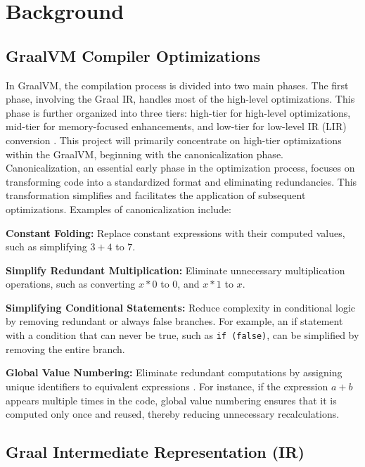 \chapter[Background]{Background}
\section{GraalVM Compiler Optimizations}

In GraalVM, the compilation process is divided into two main phases. The first phase, involving the Graal IR, handles most of the high-level optimizations. This phase is further organized into three tiers: high-tier for high-level optimizations, mid-tier for memory-focused enhancements, and low-tier for low-level IR (LIR) conversion \cite{Graal2021}. This project will primarily concentrate on high-tier optimizations within the GraalVM, beginning with the canonicalization phase. Canonicalization, an essential early phase in the optimization process, focuses on transforming code into a standardized format and eliminating redundancies. This transformation simplifies and facilitates the application of subsequent optimizations. Examples of canonicalization include:

\begin{description}
    \item \textbf{Constant Folding:} Replace constant expressions with their computed values, such as simplifying \newline
    \(3 + 4\) to \(7\).
    \item \textbf{Simplify Redundant Multiplication:} Eliminate unnecessary multiplication operations, such as converting \(x * 0\) to 0, and \(x * 1\) to \(x\).
    \item \textbf{Simplifying Conditional Statements:} Reduce complexity in conditional logic by removing redundant or always false branches. For example, an if statement with a condition that can never be true, such as \texttt{if (false)}, can be simplified by removing the entire branch.
    \item \textbf{Global Value Numbering:} Eliminate redundant computations by assigning unique identifiers to equivalent expressions \cite{Cliff1995}. For instance, if the expression \(a + b\) appears multiple times in the code, global value numbering ensures that it is computed only once and reused, thereby reducing unnecessary recalculations.
\end{description}

\section{Graal Intermediate Representation (IR)}

